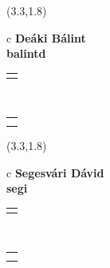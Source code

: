 \documentclass[11pt]{article}
\begin{document}
\makebox(3.3,1.8){
  \renewcommand\arraystretch{1.3}
  \begin{tabular}[c]{c}
    \hspace{8.5mm}
    \LARGE\bf{ Deáki Bálint }\\
    \hspace{8.5mm}
    \Large{ balintd }\\
    \renewcommand\arraystretch{3}
    \begin{tabular}[c]{c}
      \centering
      \fontfamily{phv}\selectfont{
        \textbf{
          \textsc{
            \scriptsize{
            \color{Bright}{ Ismerkedő }\color{Bright}{ Webmester }\color{Dark}{ Sminkmester }\color{Bright}{ Programozó }
            }
          }
        }
      }
    \end{tabular}
    \\
    \renewcommand\arraystretch{1}
    \begin{tabular}{p{3.3in}}
      \hspace{.7cm}\\
      \hspace{.7cm}\emph{  }\\
    \end{tabular}
  \end{tabular}
}

\makebox(3.3,1.8){
  \renewcommand\arraystretch{1.3}
  \begin{tabular}[c]{c}
    \hspace{8.5mm}
    \LARGE\bf{ Segesvári Dávid }\\
    \hspace{8.5mm}
    \Large{ segi }\\
    \renewcommand\arraystretch{3}
    \begin{tabular}[c]{c}
      \centering
      \fontfamily{phv}\selectfont{
        \textbf{
          \textsc{
            \scriptsize{
            \color{Dark}{ Ismerkedő }\color{Bright}{ Webmester }\color{Bright}{ Sminkmester }\color{Bright}{ Programozó }
            }
          }
        }
      }
    \end{tabular}
    \\
    \renewcommand\arraystretch{1}
    \begin{tabular}{p{3.3in}}
      \hspace{.7cm}\\
      \hspace{.7cm}\emph{  }\\
    \end{tabular}
  \end{tabular}
}
\end{document}

